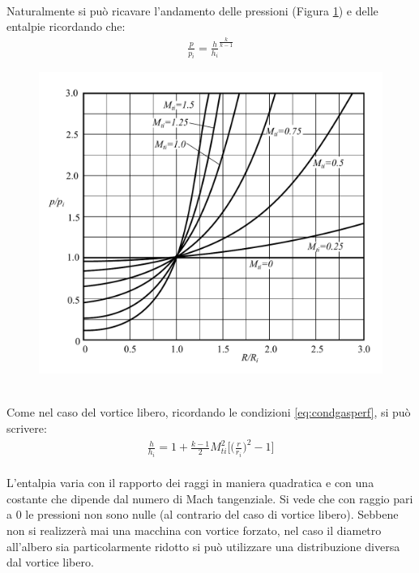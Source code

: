 \\Naturalmente si può ricavare l'andamento delle pressioni (Figura \ref{fig:PVortForz}) e delle entalpie ricordando che:
\begin{align*}
\frac{p}{p_i} = \frac{h}{h_i}^{\frac{k}{k-1}}
\end{align*}
\begin{figure}
\centering
  \includegraphics[width=.8\textwidth]{fig/PVortForz.pdf}
\caption{}
\label{fig:PVortForz}
\end{figure}
\\Come nel caso del vortice libero, ricordando le condizioni \ref{eq:condgasperf}, si può scrivere:
\begin{align*}
\boxed{\frac{h}{h_i} = 1 + \frac{k-1}{2} M_{ti}^2 \bigg[ \bigg(\frac{r}{r_i} \bigg)^2-1 \bigg]}
\end{align*}
\\L'entalpia varia con il rapporto dei raggi in maniera quadratica e con una costante che dipende dal numero di Mach tangenziale. Si vede che con raggio pari a $0$ le pressioni non sono nulle (al contrario del caso di vortice libero). Sebbene non si realizzerà mai una macchina con vortice forzato, nel caso il diametro all'albero sia particolarmente ridotto si può utilizzare una distribuzione diversa dal vortice libero. 
